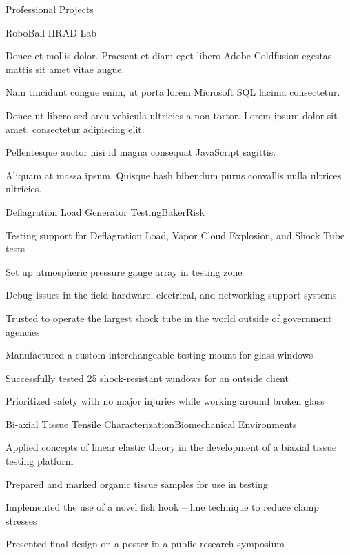 \documentclass[
	11pt, %
]{resume} %
\begin{document}
\begin{rSection}{Professional Projects}

	\begin{rSubsection}{RoboBall II}{RAD Lab}{}{}
		\item Donec et mollis dolor. Praesent et diam eget libero Adobe Coldfusion egestas mattis sit amet vitae augue.
		\item Nam tincidunt congue enim, ut porta lorem Microsoft SQL lacinia consectetur.
		\item Donec ut libero sed arcu vehicula ultricies a non tortor. Lorem ipsum dolor sit amet, consectetur adipiscing elit.
		\item Pellentesque auctor nisi id magna consequat JavaScript sagittis.
		\item Aliquam at massa ipsum. Quisque bash bibendum purus convallis nulla ultrices ultricies.
	\end{rSubsection}


	\begin{rSubsection}{Deflagration Load Generator Testing}{BakerRisk}{}{}
		\item Testing support for Deflagration Load, Vapor Cloud Explosion, and Shock Tube tests
            \item Set up atmospheric pressure gauge array in testing zone 
            \item Debug issues in the field hardware, electrical, and networking support systems
		\item Trusted to operate the largest shock tube in the world outside of government agencies
		\item Manufactured a custom interchangeable testing mount for glass windows
		\item Successfully tested 25 shock-resistant windows for an outside client
		\item Prioritized safety with no major injuries while working around broken glass
	\end{rSubsection}


	\begin{rSubsection}{Bi-axial Tissue Tensile Characterization}{Biomechanical Environments}{}{}
		\item Applied concepts of linear elastic theory in the development of a biaxial tissue testing platform
		\item Prepared and marked organic tissue samples for use in testing
		\item Implemented the use of a novel fish hook – line technique to reduce clamp stresses
		\item Presented final design on a poster in a public research symposium
	\end{rSubsection}

\end{rSection}
\end{document}
